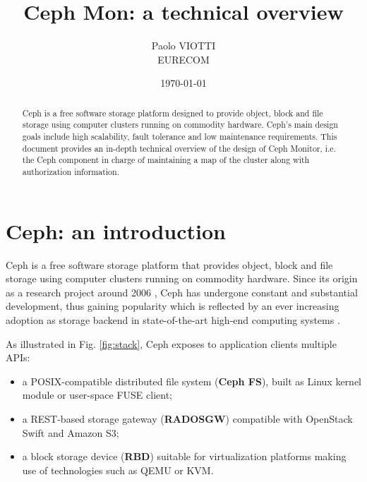 \documentclass{article}
\title{Ceph Mon: a technical overview}
\author{Paolo VIOTTI\\EURECOM}
\date{\today}
\begin{document}
\maketitle

\begin{abstract}
Ceph is a free software storage platform designed to provide object, block and file storage 
using computer clusters running on commodity hardware. 
Ceph's main design goals include high scalability, fault tolerance and low maintenance requirements.
This document provides an in-depth technical overview of the design of Ceph Monitor, 
i.e. the Ceph component in charge of maintaining a map of the cluster along with authorization information.
\end{abstract}

\section{Ceph: an introduction}
Ceph \cite{ceph} is a free software storage platform that provides object, block and file storage 
using computer clusters running on commodity hardware. 
Since its origin as a research project around 2006 \cite{ceph-paper-md,ceph-paper-crush,ceph-paper,ceph-paper-rados}, 
Ceph has undergone constant and substantial development,
thus gaining popularity which is reflected by an ever increasing adoption as storage backend in state-of-the-art
high-end computing systems \cite{ceph-openstack}.

As illustrated in Fig. \ref{fig:stack}, Ceph exposes to application clients multiple APIs: 
\begin{itemize}
	\item a POSIX-compatible distributed file system (\textbf{Ceph FS}), built as Linux kernel module or user-space FUSE client;
	\item a REST-based storage gateway (\textbf{RADOSGW}) compatible with OpenStack Swift and Amazon S3;
	\item a block storage device (\textbf{RBD}) suitable for virtualization platforms making use of technologies such as QEMU or KVM.
\end{itemize}
\end{document}
